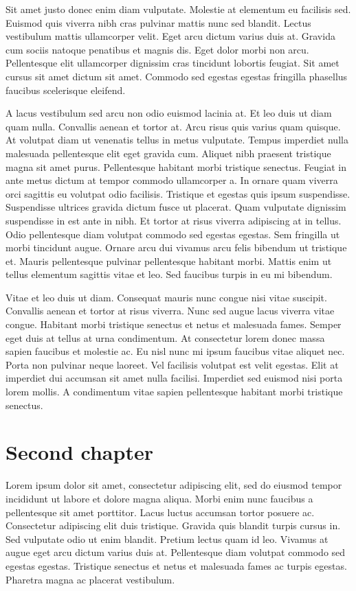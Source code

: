 \documentclass[epsf,a4paper]{book}
\begin{document}
Sit amet justo donec enim diam vulputate. Molestie at elementum eu facilisis sed. Euismod quis viverra nibh cras pulvinar mattis nunc sed blandit. Lectus vestibulum mattis ullamcorper velit. Eget arcu dictum varius duis at. Gravida cum sociis natoque penatibus et magnis dis. Eget dolor morbi non arcu. Pellentesque elit ullamcorper dignissim cras tincidunt lobortis feugiat. Sit amet cursus sit amet dictum sit amet. Commodo sed egestas egestas fringilla phasellus faucibus scelerisque eleifend.

A lacus vestibulum sed arcu non odio euismod lacinia at. Et leo duis ut diam quam nulla. Convallis aenean et tortor at. Arcu risus quis varius quam quisque. At volutpat diam ut venenatis tellus in metus vulputate. Tempus imperdiet nulla malesuada pellentesque elit eget gravida cum. Aliquet nibh praesent tristique magna sit amet purus. Pellentesque habitant morbi tristique senectus. Feugiat in ante metus dictum at tempor commodo ullamcorper a. In ornare quam viverra orci sagittis eu volutpat odio facilisis. Tristique et egestas quis ipsum suspendisse. Suspendisse ultrices gravida dictum fusce ut placerat. Quam vulputate dignissim suspendisse in est ante in nibh. Et tortor at risus viverra adipiscing at in tellus. Odio pellentesque diam volutpat commodo sed egestas egestas. Sem fringilla ut morbi tincidunt augue. Ornare arcu dui vivamus arcu felis bibendum ut tristique et. Mauris pellentesque pulvinar pellentesque habitant morbi. Mattis enim ut tellus elementum sagittis vitae et leo. Sed faucibus turpis in eu mi bibendum.

Vitae et leo duis ut diam. Consequat mauris nunc congue nisi vitae suscipit. Convallis aenean et tortor at risus viverra. Nunc sed augue lacus viverra vitae congue. Habitant morbi tristique senectus et netus et malesuada fames. Semper eget duis at tellus at urna condimentum. At consectetur lorem donec massa sapien faucibus et molestie ac. Eu nisl nunc mi ipsum faucibus vitae aliquet nec. Porta non pulvinar neque laoreet. Vel facilisis volutpat est velit egestas. Elit at imperdiet dui accumsan sit amet nulla facilisi. Imperdiet sed euismod nisi porta lorem mollis. A condimentum vitae sapien pellentesque habitant morbi tristique senectus.

\chapter{Second chapter}

Lorem ipsum dolor sit amet, consectetur adipiscing elit, sed do eiusmod tempor incididunt ut labore et dolore magna aliqua. Morbi enim nunc faucibus a pellentesque sit amet porttitor. Lacus luctus accumsan tortor posuere ac. Consectetur adipiscing elit duis tristique. Gravida quis blandit turpis cursus in. Sed vulputate odio ut enim blandit. Pretium lectus quam id leo. Vivamus at augue eget arcu dictum varius duis at. Pellentesque diam volutpat commodo sed egestas egestas. Tristique senectus et netus et malesuada fames ac turpis egestas. Pharetra magna ac placerat vestibulum.
\end{document}
